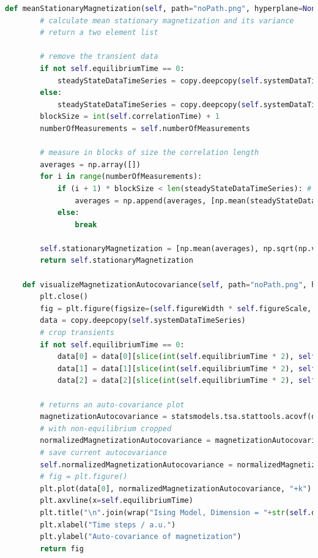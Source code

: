 \documentclass[%
showkeys,
bibnotes,
amsmath,amssymb,
floatfix,
]{revtex4-1}
\begin{document}
\begin{lstlisting}[language=Python]
    def meanStationaryMagnetization(self, path="noPath.png", hyperplane=None):
        # calculate mean stationary magnetization and its variance
        # return a two element list

        # remove the transient data
        if not self.equilibriumTime == 0:
            steadyStateDataTimeSeries = copy.deepcopy(self.systemDataTimeSeries[1][slice(int(self.equilibriumTime * 2), self.timeStep)])
        else:
            steadyStateDataTimeSeries = copy.deepcopy(self.systemDataTimeSeries[1])
        blockSize = int(self.correlationTime) + 1
        numberOfMeasurements = self.numberOfMeasurements

        # measure in blocks of size the correlation length
        averages = np.array([])
        for i in range(numberOfMeasurements):
            if (i + 1) * blockSize < len(steadyStateDataTimeSeries): # prevent running off indices
                averages = np.append(averages, [np.mean(steadyStateDataTimeSeries[slice(i * blockSize, (i + 1) * blockSize)])])
            else:
                break

        self.stationaryMagnetization = [np.mean(averages), np.sqrt(np.var(averages) / (self.numberOfMeasurements - 1))]
        return self.stationaryMagnetization

    def visualizeMagnetizationAutocovariance(self, path="noPath.png", hyperplane=None):
        plt.close()
        fig = plt.figure(figsize=(self.figureWidth * self.figureScale, self.figureHeight * self.figureScale), dpi=self.figureDpi)
        data = copy.deepcopy(self.systemDataTimeSeries)
        # crop transients
        if not self.equilibriumTime == 0:
            data[0] = data[0][slice(int(self.equilibriumTime * 2), self.timeStep)]
            data[1] = data[1][slice(int(self.equilibriumTime * 2), self.timeStep)]
            data[2] = data[2][slice(int(self.equilibriumTime * 2), self.timeStep)]

        # returns an auto-covariance plot
        magnetizationAutocovariance = statsmodels.tsa.stattools.acovf(data[1], demean=True, fft=True)
        # with non-equilibrium cropped
        normalizedMagnetizationAutocovariance = magnetizationAutocovariance/magnetizationAutocovariance[0]
        # save current autocovariance
        self.normalizedMagnetizationAutocovariance = normalizedMagnetizationAutocovariance
        # fig = plt.figure()
        plt.plot(data[0], normalizedMagnetizationAutocovariance, "+k")
        plt.axvline(x=self.equilibriumTime)
        plt.title("\n".join(wrap("Ising Model, Dimension = "+str(self.d)+", N = "+str(self.n)+", Tc = "+str(sigfig.round(float(self.tc), sigfigs=4))+"K, T = "+str(sigfig.round(float(self.t), sigfigs=4)) + "K, Time = "+str(self.timeStep)+"au", 60)))
        plt.xlabel("Time steps / a.u.")
        plt.ylabel("Auto-covariance of magnetization")
        return fig


\end{lstlisting}
\end{document}
